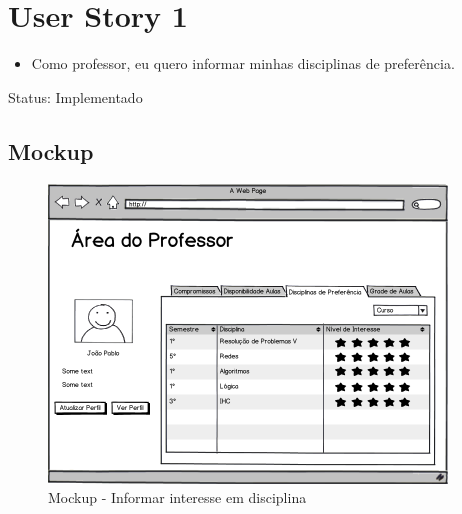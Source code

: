 \documentclass{abnt}
\begin{document}
	\clearpage
	\section{User Story 1}
	
		\begin{itemize}
			\item Como professor, eu quero informar minhas disciplinas de preferência.
		\end{itemize}
		
		Status: Implementado
		
		
		\subsection{Mockup}
		
		\begin{figure}[h]
					\begin{center}
						 \includegraphics[width=400px]{telaProfessorDisciplinas}
						 \caption{Mockup - Informar interesse em disciplina}
					\end{center}
				\end{figure}
		
\end{document}
